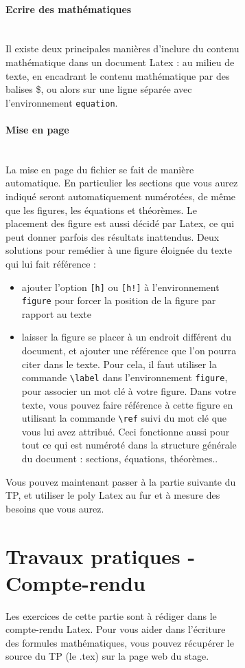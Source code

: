 \documentclass[a4paper,11pt]{article}
\begin{document}
\begin{figure}
\begin{figure}
\paragraph{Ecrire des mathématiques} \ \\
Il existe deux principales manières d'inclure du contenu mathématique dans un document Latex : au milieu de texte, en encadrant le contenu mathématique par des balises \$, ou alors sur une ligne séparée avec l'environnement {\tt equation}.

\paragraph{Mise en page}\ \\
La mise en page du fichier se fait de manière automatique. En particulier les sections que vous aurez indiqué seront automatiquement numérotées, de même que les figures, les équations et théorèmes. Le placement des figure est aussi décidé par Latex, ce qui peut donner parfois des résultats inattendus. Deux solutions pour remédier à une figure éloignée du texte qui lui fait référence :
\begin{itemize}
  \item ajouter l'option {\tt [h]} ou {\tt [h!]} à l'environnement {\tt figure} pour forcer la position de la figure par rapport au texte
  \item laisser la figure se placer à un endroit différent du document, et ajouter une référence que l'on pourra citer dans le texte. Pour cela, il faut utiliser la commande {\tt \textbackslash label} dans l'environnement {\tt figure}, pour associer un mot clé à votre figure. Dans votre texte, vous pouvez faire référence à cette figure en utilisant la commande {\tt \textbackslash ref} suivi du mot clé que vous lui avez attribué. Ceci fonctionne aussi pour tout ce qui est numéroté dans la structure générale du document : sections, équations, théorèmes..
\end{itemize}

Vous pouvez maintenant passer à la partie suivante du TP, et utiliser
le poly Latex au fur et à mesure des besoins que vous aurez.


\section{Travaux pratiques - Compte-rendu}

Les exercices de cette partie sont à rédiger dans le compte-rendu
Latex. Pour vous aider dans l'écriture des formules mathématiques,
vous pouvez récupérer le source du TP (le .tex) sur la page web du
stage.


\end{figure}
\end{figure}
\end{document}
